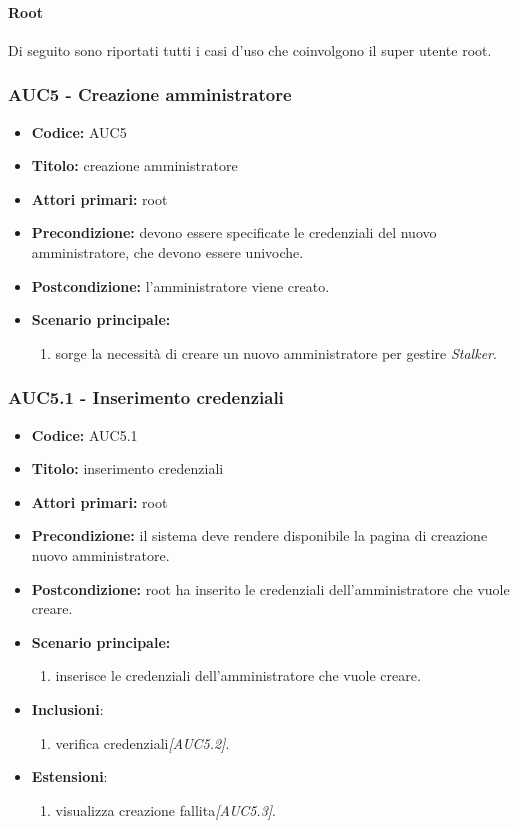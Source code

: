 \documentclass[casi-duso]{subfiles}
\begin{document}
\paragraph{Root}
Di seguito sono riportati tutti i casi d'uso che coinvolgono il super utente root.

\subsubsection{AUC5 - Creazione amministratore}%
\label{subsub:AUC5}
\begin{itemize}
  \item \textbf{Codice:} AUC5
  \item \textbf{Titolo:} creazione amministratore
  \item \textbf{Attori primari:} root
  \item \textbf{Precondizione:} devono essere specificate le credenziali del nuovo amministratore, che devono essere univoche.
  \item \textbf{Postcondizione:} l'amministratore viene creato.
  \item \textbf{Scenario principale:}
  \begin{enumerate}
    \item sorge la necessità di creare un nuovo amministratore per gestire \emph{Stalker}.
  \end{enumerate}
\end{itemize}


\subsubsection{AUC5.1 - Inserimento credenziali}%
\label{subsub:AUC5.1}
\begin{itemize}
  \item \textbf{Codice:} AUC5.1
  \item \textbf{Titolo:} inserimento credenziali
  \item \textbf{Attori primari:} root
  \item \textbf{Precondizione:} il sistema deve rendere disponibile la pagina di creazione nuovo amministratore.
  \item \textbf{Postcondizione:} root ha inserito le credenziali dell'amministratore che vuole creare.
  \item \textbf{Scenario principale:}
  \begin{enumerate}
    \item {} inserisce le credenziali dell'amministratore che vuole creare.
  \end{enumerate}
  \item \textbf{Inclusioni}:
  \begin{enumerate}
    \item verifica credenziali\emph{[AUC5.2]}.
  \end{enumerate}
  \item \textbf{Estensioni}:
  \begin{enumerate}
    \item  visualizza creazione fallita\emph{[AUC5.3]}.
  \end{enumerate}
\end{itemize}
\end{document}
